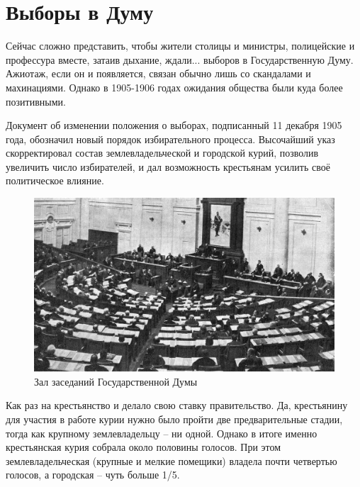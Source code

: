 
\chapter{Выборы в Думу}


Сейчас сложно представить, чтобы жители столицы и министры, полицейские и профессура вместе, затаив дыхание, ждали... выборов в Государственную Думу. Ажиотаж, если он и появляется, связан обычно лишь со скандалами и махинациями. Однако в 1905-1906 годах ожидания общества были куда более позитивными.

Документ об изменении положения о выборах, подписанный 11 декабря 1905 года, обозначил новый порядок избирательного процесса. Высочайший указ скорректировал состав землевладельческой и городской курий, позволив увеличить число избирателей, и дал возможность крестьянам усилить своё политическое влияние.
\begin{figure}[h!tb] 
	\centering\includegraphics[scale=0.3]{Data/Vybory_V_Dumu/4Sf3k5B8MJ4.jpg}
	\caption{Зал заседаний Государственной Думы }%
\end{figure}

Как раз на крестьянство и делало свою ставку правительство. Да, крестьянину для участия в работе курии нужно было пройти две предварительные стадии, тогда как крупному землевладельцу – ни одной. Однако в итоге именно крестьянская курия собрала около половины голосов. При этом землевладельческая (крупные и мелкие помещики) владела почти четвертью голосов, а городская – чуть больше 1/5.

